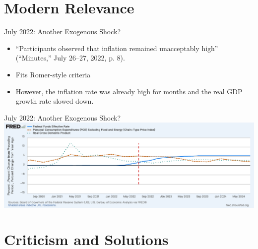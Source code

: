\documentclass{beamer}
\begin{document}
\section{Modern Relevance}

\begin{frame}{July 2022: Another Exogenous Shock?}
  \begin{itemize}
    \item “Participants observed that inflation remained unacceptably high” (“Minutes,” July 26–27,  2022, p. 8).
    \item Fits Romer-style criteria
    \item However, the inflation rate was already high for months and the real GDP growth rate slowed down.
  \end{itemize}

\end{frame}

\begin{frame}{July 2022: Another Exogenous Shock?}
  \centering
  \includegraphics[width=1\linewidth]{Graphs/Jul2022Shocks.png}
\end{frame}
\section{Criticism and Solutions}
\end{document}
